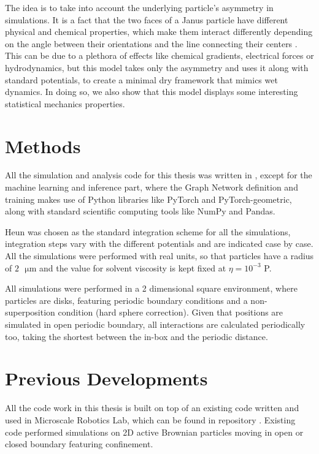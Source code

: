 \documentclass[../../master_thesis_np.tex]{subfiles}
\begin{document}
	The idea is to take into account the underlying particle's asymmetry in simulations. It is a fact that the two faces of a Janus particle have different physical and chemical properties, which make them interact differently depending on the angle between their orientations and the line connecting their centers \cite{singh_pair_2024}. This can be due to a plethora of effects like chemical gradients, electrical forces or hydrodynamics, but this model takes only the asymmetry and uses it along with standard potentials, to create a minimal dry framework that mimics wet dynamics. In doing so, we also show that this model displays some interesting statistical mechanics properties.
	
	\section{Methods}
	All the simulation and analysis code for this thesis was written in \julia, except for the machine learning and inference part, where the Graph Network definition and training makes use of Python libraries like PyTorch and PyTorch-geometric, along with standard scientific computing tools like NumPy and Pandas.
	
	Heun was chosen as the standard integration scheme for all the simulations, integration steps vary with the different potentials and are indicated case by case. All the simulations were performed with real units, so that particles have a radius of $2\text{ }\mathrm{\mu m}$ and the value for solvent viscosity is kept fixed at $\eta = 10^{-3}$ P.
	
	All simulations were performed in a 2 dimensional square environment, where particles are disks, featuring periodic boundary conditions and a non-superposition condition (hard sphere correction). Given that positions are simulated in open periodic boundary, all interactions are calculated periodically too, taking the shortest between the in-box and the periodic distance.
	
	\section{Previous Developments}
	All the code work in this thesis is built on top of an existing code written and used in Microscale Robotics Lab, which can be found in repository \cite{sharma_simulations_2023}. Existing code performed simulations on 2D active Brownian particles moving in open or closed boundary featuring confinement. 
	
\end{document}
